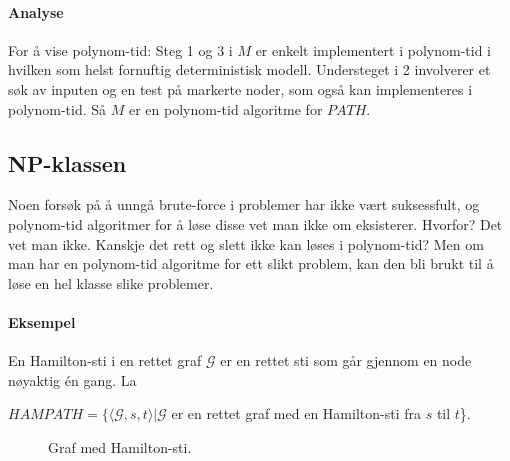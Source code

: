 \documentclass[11pt,a4paper]{article}
\begin{document}
\paragraph{Analyse} For å vise polynom-tid:
Steg 1 og 3 i $M$ er enkelt implementert i polynom-tid i hvilken som helst fornuftig deterministisk modell. Understeget i 2 involverer et søk av inputen og en test på markerte noder, som også kan implementeres i polynom-tid. Så $M$ er en polynom-tid algoritme for $PATH$.

\subsection{NP-klassen}

Noen forsøk på å unngå brute-force i problemer har ikke vært suksessfult, og polynom-tid algoritmer for å løse disse vet man ikke om eksisterer. Hvorfor? Det vet man ikke. Kanskje det rett og slett ikke kan løses i polynom-tid? Men om man har en polynom-tid algoritme for ett slikt problem, kan den bli brukt til å løse en hel klasse slike problemer.

\paragraph{Eksempel} En Hamilton-sti i en rettet graf $\mathcal{G}$ er en rettet sti som går gjennom en node nøyaktig én gang. La
\begin{center}
$HAMPATH = \{\langle \mathcal{G},s,t\rangle | \mathcal{G}$ er en rettet graf med en Hamilton-sti fra $s$ til $t$\}.
\end{center}

\begin{figure}[h!]
\centering
{}
\caption{Graf med Hamilton-sti.}
\end{figure}
\end{document}
